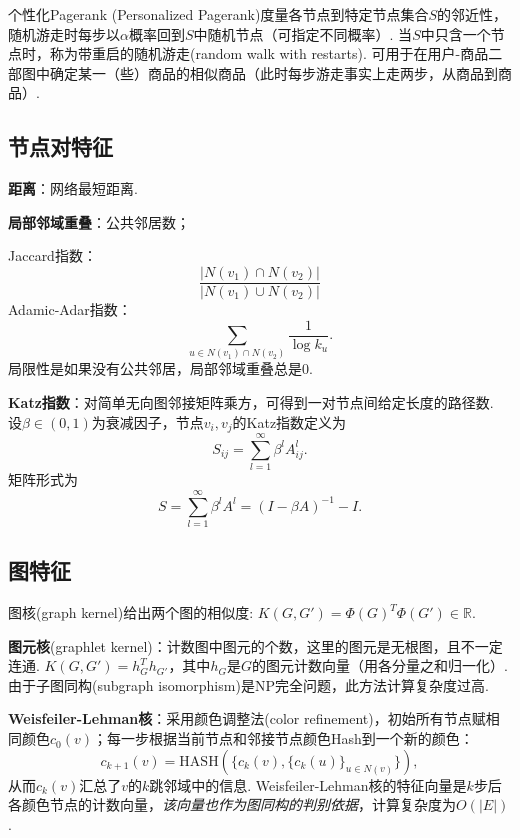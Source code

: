 \par 个性化Pagerank (Personalized Pagerank)度量各节点到特定节点集合$S$的邻近性，随机游走时每步以$\alpha$概率回到$S$中随机节点（可指定不同概率）. 当$S$中只含一个节点时，称为带重启的随机游走(random walk with restarts). 可用于在用户-商品二部图中确定某一（些）商品的相似商品（此时每步游走事实上走两步，从商品到商品）. 

\subsection{节点对特征}

\par \textbf{距离}：网络最短距离. 
\par \textbf{局部邻域重叠}：公共邻居数；
\par Jaccard指数：
\begin{equation}
    \frac{\vert N(v_1)\cap N(v_2)\vert}{\vert N(v_1)\cup N(v_2)\vert}
\end{equation}
Adamic-Adar指数：
\begin{equation}
    \sum_{u\in N(v_1)\cap N(v_2)} \frac{1}{\log k_u}.
\end{equation}
局限性是如果没有公共邻居，局部邻域重叠总是0.

\par \textbf{Katz指数}：对简单无向图邻接矩阵乘方，可得到一对节点间给定长度的路径数. 设$\beta \in (0,1)$为衰减因子，节点$v_i,v_j$的Katz指数定义为
\begin{equation}
    S_{ij}=\sum_{l=1}^\infty \beta^l A^l_{ij}.
\end{equation}
矩阵形式为
\begin{equation}
    S=\sum_{l=1}^\infty \beta^l A^l=(I-\beta A)^{-1}-I.
\end{equation}

\subsection{图特征}
\par 图核(graph kernel)给出两个图的相似度: $K(G,G')=\Phi(G)^T \Phi(G')\in \mathbb{R}$.
\par \textbf{图元核}(graphlet kernel)：计数图中图元的个数，这里的图元是无根图，且不一定连通. $K(G,G')=h_G^T h_{G'}$，其中$h_G$是$G$的图元计数向量（用各分量之和归一化）. 由于子图同构(subgraph isomorphism)是NP完全问题，此方法计算复杂度过高. 

\par \textbf{Weisfeiler-Lehman核}：采用颜色调整法(color refinement)，初始所有节点赋相同颜色$c_0(v)$；每一步根据当前节点和邻接节点颜色Hash到一个新的颜色：
\begin{equation}
    c_{k+1}(v)=\text{HASH}(\{c_k(v),\{c_k(u)\}_{u\in N(v)}\}),
\end{equation}
从而$c_k(v)$汇总了$v$的$k$跳邻域中的信息. Weisfeiler-Lehman核的特征向量是$k$步后各颜色节点的计数向量，\emph{该向量也作为图同构的判别依据}，计算复杂度为$O(\vert E \vert)$.

